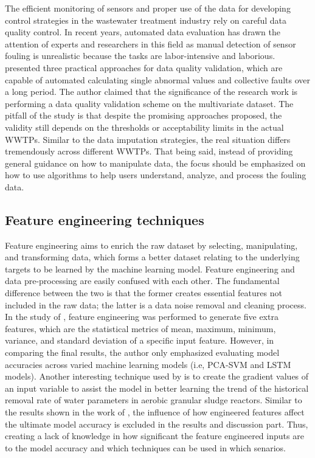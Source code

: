 The efficient monitoring of sensors and proper use of the data for developing control strategies in the wastewater treatment industry rely on careful data quality control. In recent years, automated data evaluation has drawn the attention of experts and researchers in this field as manual detection of sensor fouling is unrealistic because the tasks are labor-intensive and laborious. \citet{alferesValidatingDataQuality2013} presented three practical approaches for data quality validation, which are capable of automated calculating single abnormal values and collective faults over a long period. The author claimed that the significance of the research work is performing a data quality validation scheme on the multivariate dataset. The pitfall of the study is that despite the promising approaches proposed, the validity still depends on the thresholds or acceptability limits in the actual WWTPs. Similar to the data imputation strategies, the real situation differs tremendously across different WWTPs. That being said, instead of providing general guidance on how to manipulate data, the focus should be emphasized on how to use algorithms to help users understand, analyze, and process the fouling data.

\subsection{Feature engineering techniques}
Feature engineering aims to enrich the raw dataset by selecting, manipulating, and transforming data, which forms a better dataset relating to the underlying targets to be learned by the machine learning model. Feature engineering and data pre-processing are easily confused with each other. The fundamental difference between the two is that the former creates essential features not included in the raw data; the latter is a data noise removal and cleaning process. In the study of \citet{mamandipoorMonitoringDetectingFaults2020}, feature engineering was performed to generate five extra features, which are the statistical metrics of mean, maximum, minimum, variance, and standard deviation of a specific input feature. However, in comparing the final results, the author only emphasized evaluating model accuracies across varied machine learning models (i.e, PCA-SVM and LSTM models). Another interesting technique used by \citet{zaghloulDevelopmentEnsembleMachine2021} is to create the gradient values of an input variable to assist the model in better learning the trend of the historical removal rate of water parameters in aerobic granular sludge reactors. Similar to the results shown in the work of \citet{mamandipoorMonitoringDetectingFaults2020}, the influence of how engineered features affect the ultimate model accuracy is excluded in the results and discussion part. Thus, creating a lack of knowledge in how significant the feature engineered inputs are to the model accuracy and which techniques can be used in which senarios. 

